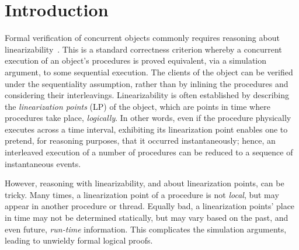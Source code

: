 \section{Introduction}
\label{sc:intro} 
   
Formal verification of concurrent objects commonly requires reasoning
about linearizability~\cite{Herlihy-Wing:TOPLAS90}. This is a standard
correctness criterion whereby a concurrent execution of an object's
procedures is proved equivalent, via a simulation argument, to some
sequential execution. The clients of the object can be verified under
the sequentiality assumption, rather than by inlining the procedures
and considering their interleavings. Linearizability is often
established by describing the \emph{linearization points} (LP) of the
object, which are points in time where procedures take place,
\emph{logically}.  In other words, even if the procedure physically
executes across a time interval, exhibiting its linearization point
enables one to pretend, for reasoning purposes, that it occurred
instantaneously; hence, an interleaved execution of a number of
procedures can be reduced to a sequence of instantaneous events.


However, reasoning with linearizability, and about linearization
points, can be tricky. Many times, a linearization point of a
procedure is not \emph{local}, but may appear in another procedure or
thread. Equally bad, a linearization points' place in time may not be
determined statically, but may vary based on the past, and even
future, \emph{run-time} information. This complicates the simulation
arguments, leading to unwieldy formal logical proofs.


